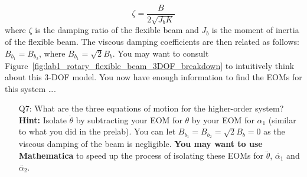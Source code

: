 \documentclass[12pt]{report}
\newcommand\drew[1]{\textcolor{red}{#1}}
\newcommand{\pder}[2]{\frac{\partial #1}{\partial #2}}
\begin{document}
\[
    \zeta = \frac{B}{2\sqrt{J_b K}}
\]
where  $\zeta$ is the damping ratio of the flexible beam and $J_b$ is the moment of inertia of the flexible beam. The viscous damping coefficients are then related as follows: $B_{b_1} = B_{b_2}$, where $B_{b_1} = \sqrt{2} B_b$. You may want to consult Figure~\ref{fig:lab1_rotary_flexible_beam_3DOF_breakdown} to intuitively think about this 3-DOF model.
You now have enough information to find the EOMs for this system \dots.
\begin{enumerate}[Question]
    \item[Q7:] What are the three equations of motion for the higher-order system?\\
          \textbf{Hint:} Isolate $\ddot{\theta}$ by subtracting your EOM for $\theta$ by your EOM for $\alpha_1$ (similar to what you did in the prelab). You can let $B_{b_1} = B_{b_2} = \sqrt{2}B_b = 0$ as the viscous damping of the beam is negligible. \textbf{You may want to use Mathematica} to speed up the process of isolating these EOMs for $\ddot{\theta}$, $\ddot{\alpha_1}$ and $\ddot{\alpha_2}$.\\

\end{enumerate}
\end{document}
